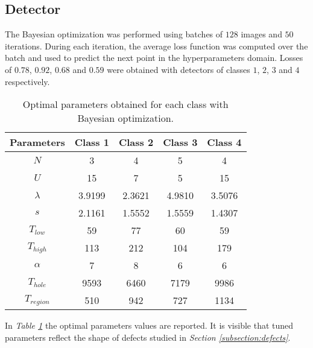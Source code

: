     \subsection{Detector}\label{section:results:detector}
    \par{
    	The Bayesian optimization was performed using batches of $128$ images and $50$ iterations. During each iteration, the average loss function was computed over the batch and used to predict the next point in the hyperparameters domain. Losses of $0.78$, $0.92$, $0.68$ and $0.59$ were obtained with detectors of classes $1$, $2$, $3$ and $4$ respectively.
    }	
    \begin{table}
        \centering
        \normalsize
		\begin{tabular}{|c|c|c|c|c|}
			\hline
			\textbf{Parameters} & \textbf{Class 1} & \textbf{Class 2} & \textbf{Class 3} & \textbf{Class 4}\\ \hline
			$N$ & 3 & 4 & 5 & 4 \\ \hline
			$U$ & 15 & 7 & 5 & 15 \\ \hline
			$\lambda$ & 3.9199 & 2.3621 & 4.9810 & 3.5076 \\ \hline
			$s$ & 2.1161 & 1.5552 & 1.5559 & 1.4307 \\ \hline
			$T_{low}$ & 59 & 77 & 60 & 59 \\ \hline
			$T_{high}$ & 113 & 212 & 104 & 179 \\ \hline
			$\alpha$ & 7 & 8 & 6 & 6 \\ \hline
			$T_{hole}$ & 9593 & 6460 & 7179 & 9986 \\ \hline
			$T_{region}$ & 510 & 942 & 727 & 1134 \\ \hline
		\end{tabular}
		\vspace{0.25cm}
		\caption{Optimal parameters obtained for each class with Bayesian optimization.}
		\label{table:params-bayesopt}
	\end{table}
	\par{
		In \emph{Table \ref{table:params-bayesopt}} the optimal parameters values are reported. It is visible that tuned parameters reflect the shape of defects studied in \emph{Section \ref{subsection:defects}}.
	}	
